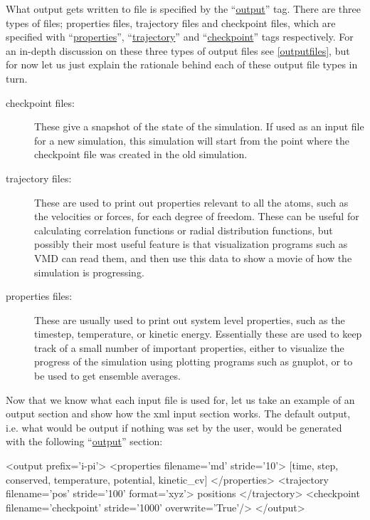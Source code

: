 \documentclass[11pt,english,fleqn]{report}
\newenvironment{code}{%
\footnotesize 
\verbatim
}{
\endverbatim
\normalsize
}
\begin{document}
What output gets written to file is specified by the 
{}``\hyperref[OUTPUTS]{output}'' tag.
There are three types of files; properties files, 
trajectory files and checkpoint files, which are specified with 
{}``\hyperref[PROPERTIES]{properties}'', 
{}``\hyperref[TRAJECTORY]{trajectory}'' 
and {}``\hyperref[CHECKPOINT]{checkpoint}'' tags respectively.
For an in-depth discussion on these three types
of output files see \ref{outputfiles}, 
but for now let us just explain the rationale
behind each of these output file types in turn.

\begin{description}
\item[checkpoint files:]
These give a snapshot of the state of the simulation.
If used as an input file for a new \ipi simulation,
this simulation will start from the point where the
checkpoint file was created in the old simulation.
\item[trajectory files:] 
These are used to print out properties
relevant to all the atoms, such as the velocities or forces, for each degree of freedom.
These can be useful
for calculating correlation functions or radial distribution functions,
but possibly their most useful feature is that visualization
programs such as VMD can read them, and then use this data to show
a movie of how the simulation is progressing. 
\item[properties files:] 
These are usually used to print out
system level properties, such as the timestep, temperature,
or kinetic energy. Essentially these are used to keep track of a small
number of important properties, either to visualize the
progress of the simulation using plotting programs such as gnuplot, 
or to be used to get ensemble averages.
\end{description}

Now that we know what each input file is used for, let us take an
example of an output section and show how the xml input section works.
The default output, i.e. what would be output if nothing was set by the user, 
would be generated with the following {}``\hyperref[OUTPUTS]{output}'' section:

\begin{code}
<output prefix='i-pi'>
   <properties filename='md' stride='10'>
      [time, step, conserved, temperature, potential, kinetic_cv]
   </properties>
   <trajectory filename='pos' stride='100' format='xyz'>
      positions
   </trajectory>
   <checkpoint filename='checkpoint' stride='1000' overwrite='True'/>
</output>
\end{code}
\end{document}
